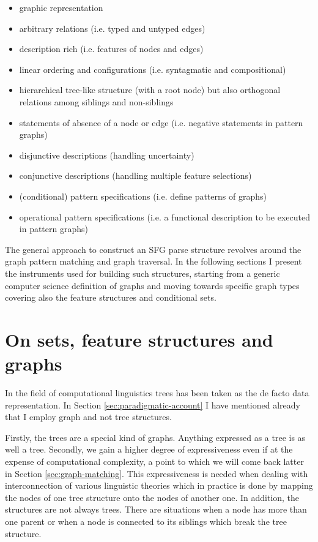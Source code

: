 \begin{itemize}
	\item graphic representation 
    \item arbitrary relations (i.e. typed and untyped edges)
	\item description rich (i.e. features of nodes and edges)
	\item linear ordering and configurations (i.e. syntagmatic and compositional)
	\item hierarchical tree-like structure (with a root node) but also orthogonal relations among siblings and non-siblings
	\item statements of absence of a node or edge (i.e. negative statements in pattern graphs)
	\item disjunctive descriptions (handling uncertainty)
	\item conjunctive descriptions (handling multiple feature selections)
	\item (conditional) pattern specifications (i.e. define patterns of graphs)
	\item operational pattern specifications (i.e. a functional description to be executed in pattern graphs)
\end{itemize}

The general approach to construct an SFG parse structure revolves around the graph pattern matching and graph traversal. In the following sections I present the instruments used for building such structures, starting from a generic computer science definition of graphs and moving towards specific graph types covering also the feature structures and conditional sets. 

\section{On sets, feature structures and graphs}
\label{sec:graphs}

In the field of computational linguistics trees has been taken as the de facto data representation. In Section \ref{sec:paradigmatic-account} I have mentioned already that I employ graph and not tree structures. 

Firstly, the trees are a special kind of graphs. Anything expressed as a tree is as well a tree. Secondly, we gain a higher degree of expressiveness even if at the expense of computational complexity, a point to which we will come back latter in Section \ref{sec:graph-matching}. This expressiveness is needed when dealing with interconnection of various linguistic theories which in practice is done by mapping the nodes of one tree structure onto the nodes of another one. In addition, the structures are not always trees. There are situations when a node has more than one parent or when a node is connected to its siblings which break the tree structure. 


